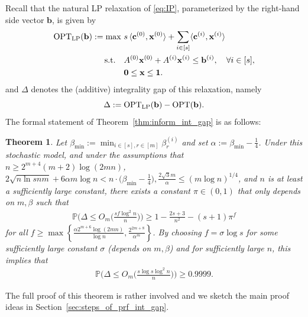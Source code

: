 \documentclass{article}
\renewcommand{\P}{\mathbb{P}}
\newcommand{\cv}[0]{\mathbf{c}}
\newcommand{\xv}[0]{\mathbf{x}}
\newcommand{\bv}[0]{\mathbf{b}}
\newtheorem{thm}{Theorem}[section]
\newcommand{\OPT}{\textup{OPT}}
\begin{document}
Recall that the natural LP relaxation of \eqref{eq:IP}, parameterized by the right-hand side vector $\bv$, is given by
\begin{subequations}
\label{prob_lp_relax}
\begin{align}
\OPT_{\mathrm{LP}}(\bv)
:=\max \ & s \, \langle \cv^{(0)}, \xv^{(0)} \rangle
+ \sum_{i \in [s]} \langle \cv^{(i)}, \xv^{(i)} \rangle \\
\text{s.t.}\quad
& A^{(0)} \xv^{(0)} + A^{(i)} \xv^{(i)} \le \bv^{(i)}, 
\quad \forall i \in [s], \label{eq:sub_LP_relax}\\
& \mathbf{0} \le \xv \le \mathbf{1}. \label{eq:LPLast}
\end{align}
\end{subequations} and $\Delta$ denotes the (additive) integrality gap of this relaxation, namely $$\Delta := \OPT_{\text{LP}}(\bv)  - \OPT(\bv).$$
The formal statement of Theorem~\ref{thm:inform_int_gap} is as follows:
\begin{thm} \label{thm:smallGap}
    Let $\beta_{\min} := \min_{i \in [s], r \in [m]} \beta^{(i)}_r$ and set $\alpha := \beta_{\min} - \frac{1}{4}$.
    Under this stochastic model, and under the assumptions that $n \ge 2^{m+4} (m+2) \log(2mn)$, $2 \sqrt{n \ln s n m} + 6\alpha m \log n < n \cdot \big(\beta_{\min} - \frac{1}{4}\big), \frac{2\sqrt{3}m}{\alpha} \leq (m \log n)^{1/4}$, and $n$ is at least a sufficiently large constant, there exists a constant $\pi \in (0,1)$ that only depends on $m,\beta$ such that
    \begin{align*}
        \P\bigg(\Delta \le O_m\bigg(\frac{sf\log^2 n}{n}\bigg)\bigg) \ge 1 - {\frac{2s+3}{n^2}-(s+1) \pi^f}
    \end{align*}
    for all $f \geq \max\left\{\frac{\alpha 2^{m+6} \log (2mn)}{\log n}, \frac{2^{2m+8}}{\alpha^m}\right\}$.
    By choosing $f = \sigma \log s$ for some sufficiently large constant $\sigma$ (depends on $m,\beta$) and for sufficiently large $n$, this implies that
    \begin{align*}
         \P\bigg(\Delta \le O_m\bigg(\frac{s \log s\log^2 n}{n}\bigg)\bigg) \ge 0.9999.
    \end{align*}
\end{thm}

The full proof of this theorem is rather involved and we sketch the main proof ideas in Section~\ref{sec:steps_of_prf_int_gap}.
\end{document}
